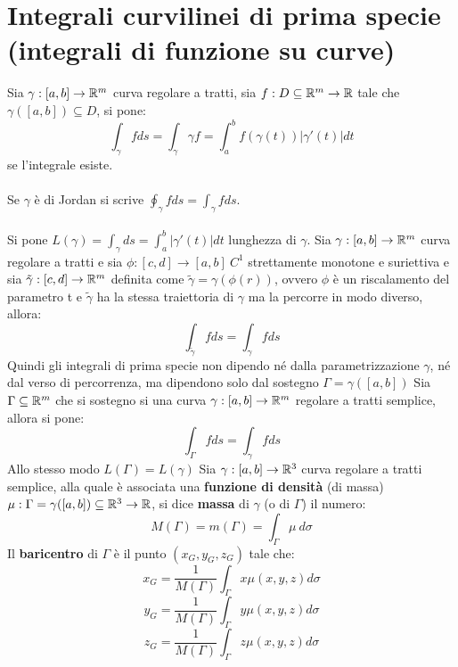 	\section{Integrali curvilinei di prima specie (integrali di funzione su curve)}
	Sia $\gamma:[a, b] \rightarrow \mathbb{R}^m$ curva regolare a tratti, sia $f:D\subseteq \mathbb{R}^m \rightarrow \mathbb{R}$ tale che $\gamma([a,b])\subseteq D$, si pone:
	$$\int_\gamma f ds = \int_\gamma \gamma f = \int_a^b f(\gamma(t))|\gamma'(t)|dt$$
	se l'integrale esiste.\\
	\\
	Se $\gamma$ è di Jordan si scrive $\oint_\gamma f ds = \int_\gamma fds$.\\
	\\
	Si pone $L(\gamma)=\int_\gamma ds=\int_{a}^{b}|\gamma'(t)|dt$ lunghezza di $\gamma$.
	\prop
	Sia $\gamma:[a, b] \rightarrow \mathbb{R}^m$ curva regolare a tratti e sia $\phi : [c, d] \rightarrow [a, b] \ C^1$ strettamente monotone e suriettiva e sia $\tilde{\gamma} : [c, d]\rightarrow \mathbb{R}^m$ definita come $\tilde{\gamma}=\gamma ( \phi (r) )$, ovvero  $\phi$ è un riscalamento del parametro t e $\tilde{\gamma}$ ha la stessa traiettoria di $\gamma$ ma la percorre in modo diverso, allora:
	$$\int_{\tilde{\gamma}} fds=\int_\gamma fds$$
	Quindi gli integrali di prima specie non dipendo né dalla parametrizzazione $\gamma$, né dal verso di percorrenza, ma dipendono solo dal sostegno $\Gamma=\gamma([a,b])$
	Sia $\Gamma \subseteq \mathbb{R}^m$ che si sostegno si una curva $\gamma:[a, b] \rightarrow \mathbb{R}^m$ regolare a tratti semplice, allora si pone:
	$$\int_\Gamma fds= \int_\gamma fds$$
	Allo stesso modo $L(\Gamma)=L(\gamma)$
	Sia $\gamma :  [a,b]\rightarrow \mathbb{R} ^3$ curva regolare a tratti semplice, alla quale è associata una \textbf{funzione di densità} (di massa) $\mu:  \Gamma =\gamma([a,b])\subseteq \mathbb{R}^3 \rightarrow \mathbb{R}$, si dice \textbf{massa} di $\gamma$ (o di $\Gamma$) il numero:
	$$M(\Gamma)=m(\Gamma)=\int_\Gamma \mu \ d\sigma$$
	Il \textbf{baricentro} di $\Gamma$ è il punto $(x_G, y_G, z_G)$ tale che:
	$$x_G=\frac{1}{M(\Gamma)}\int_\Gamma x \mu (x,y,z) d \sigma$$
	$$y_G=\frac{1}{M(\Gamma)}\int_\Gamma y \mu (x,y,z) d \sigma$$
	$$z_G=\frac{1}{M(\Gamma)}\int_\Gamma z \mu (x,y,z) d \sigma$$
